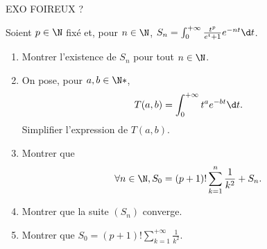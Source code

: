 \begin{enonce}
  \glissant EXO FOIREUX ?
\begin{exercise}[ID={RMS126 E869},subtitle={CCP MP 2015},tags={}, difficulty={0}]
Soient $p\in\N$ fixé et, pour $n\in\N$, $S_n=\int_0^{+\infty} \frac{t^p}{e^t + 1} e^{-nt}\d t$.
\begin{enumerate}
  \item Montrer l'existence de $S_n$ pour tout $n\in\N$.
  \item On pose, pour $a,b\in\N*$,
    \begin{equation*}
      T(a,b)=\int_0^{+\infty} t^a e^{-bt}\d t.
    \end{equation*}
    Simplifier l'expression de $T(a,b)$.

  \item Montrer que
    \begin{equation*}
      \forall n\in\N, S_0 = (p+1)! \sum_{k=1}^{n} \frac1{k^2} + S_n.
    \end{equation*}

  \item Montrer que la suite $\left( S_n \right)$ converge.

  \item Montrer que $S_0  = (p+1)! \sum_{k=1}^{+\infty}\frac1{k^2}$.
\end{enumerate}
\end{exercise}
\begin{solution}
\end{solution}
\end{enonce}
